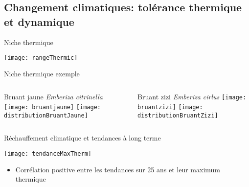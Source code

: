 \documentclass[10pt]{beamer}
\begin{document}
\subsection{Changement climatiques: tolérance thermique et dynamique}

\begin{frame}{Niche thermique}
  \begin{center}
   \texttt{[image: rangeThermic]}
  \end{center}

\end{frame}

\begin{frame}{Niche thermique exemple}
  \begin{columns}[c]
    \begin{column}[c]{0.5\textwidth}
      \begin{center}
       Bruant jaune \textit{Emberiza citrinella}
        \vspace{10pt}
        \texttt{[image: bruantjaune]}
          \vspace{5pt}
          \texttt{[image: distributionBruantJaune]}   
      \end{center}
    \end{column}
    \begin{column}[c]{0.5\textwidth}
   
     \begin{center}
       Bruant zizi \textit{Emberiza cirlus}
        \vspace{10pt}
        \texttt{[image: bruantzizi]}
          \vspace{5pt}
          \texttt{[image: distributionBruantZizi]}   
      \end{center}
    
    
    \end{column}
  \end{columns}
\end{frame}

\begin{frame}{Réchauffement climatique et tendances à long terme}
  \begin{center}
   \texttt{[image: tendanceMaxTherm]}\\
  \vspace{10pt}
   \begin{itemize}
    \item <2> Corrélation positive entre les tendances sur 25 ans et leur maximum thermique
   \end{itemize}

  \end{center}

\end{frame}
\end{document}
